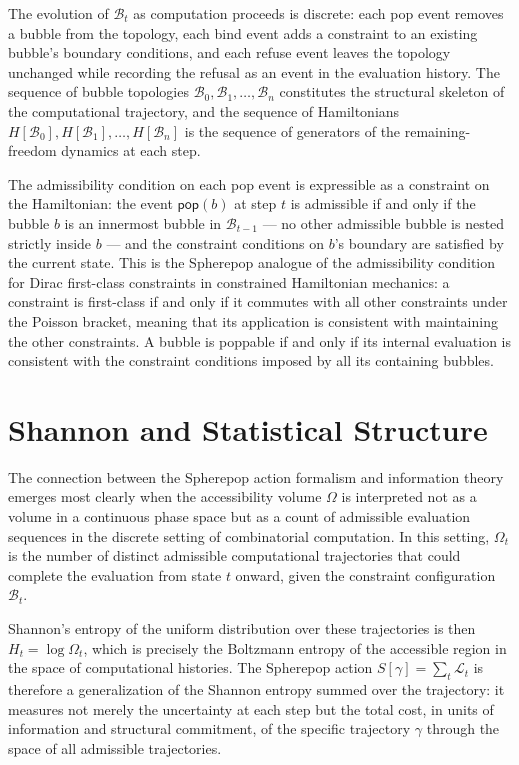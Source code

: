 \documentclass[12pt,openany]{book}
\theoremstyle{plain}
\theoremstyle{definition}
\theoremstyle{remark}
\newcommand{\spop}[1]{\mathsf{pop}\!\left(#1\right)}
\begin{document}
The evolution of $\mathcal{B}_t$ as computation proceeds is discrete: each pop event removes a bubble from the topology, each bind event adds a constraint to an existing bubble's boundary conditions, and each refuse event leaves the topology unchanged while recording the refusal as an event in the evaluation history. The sequence of bubble topologies $\mathcal{B}_0, \mathcal{B}_1, \ldots, \mathcal{B}_n$ constitutes the structural skeleton of the computational trajectory, and the sequence of Hamiltonians $H[\mathcal{B}_0], H[\mathcal{B}_1], \ldots, H[\mathcal{B}_n]$ is the sequence of generators of the remaining-freedom dynamics at each step.

The admissibility condition on each pop event is expressible as a constraint on the Hamiltonian: the event $\spop{b}$ at step $t$ is admissible if and only if the bubble $b$ is an innermost bubble in $\mathcal{B}_{t-1}$ — no other admissible bubble is nested strictly inside $b$ — and the constraint conditions on $b$'s boundary are satisfied by the current state. This is the Spherepop analogue of the admissibility condition for Dirac first-class constraints in constrained Hamiltonian mechanics: a constraint is first-class if and only if it commutes with all other constraints under the Poisson bracket, meaning that its application is consistent with maintaining the other constraints. A bubble is poppable if and only if its internal evaluation is consistent with the constraint conditions imposed by all its containing bubbles.

\section{Shannon and Statistical Structure}

The connection between the Spherepop action formalism and information theory emerges most clearly when the accessibility volume $\Omega$ is interpreted not as a volume in a continuous phase space but as a count of admissible evaluation sequences in the discrete setting of combinatorial computation. In this setting, $\Omega_t$ is the number of distinct admissible computational trajectories that could complete the evaluation from state $t$ onward, given the constraint configuration $\mathcal{B}_t$.

Shannon's entropy of the uniform distribution over these trajectories is then $H_t = \log \Omega_t$, which is precisely the Boltzmann entropy of the accessible region in the space of computational histories. The Spherepop action $S[\gamma] = \sum_t \mathcal{L}_t$ is therefore a generalization of the Shannon entropy summed over the trajectory: it measures not merely the uncertainty at each step but the total cost, in units of information and structural commitment, of the specific trajectory $\gamma$ through the space of all admissible trajectories.
\end{document}
